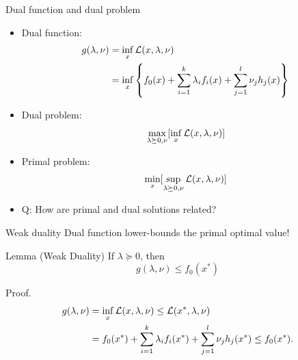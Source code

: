 \documentclass[notes]{beamer}
\begin{document}
\begin{frame}
	{Dual function and dual problem}
	\begin{itemize}
		\item Dual function:
		      \begin{equation*}
			      \begin{aligned}
				      g(\lambda , \nu) & = \inf_x \mathcal{L} (x,\lambda,\nu )                                                                  \\
				                       & =\inf_x \left\{ f_0(x)+\sum_{i=1}^{k} \lambda_i f_i(x) + \sum_{j=1}^{l} \nu_j h_j (x) \right\} \\
			      \end{aligned}
		      \end{equation*}

		\item Dual problem: \[\max_{\lambda \succeq 0,\nu} [\inf_{x} \mathcal{L}(x,\lambda, \nu)] \]
		\item Primal problem: \[\min_x [\sup_{\lambda \succeq 0, \nu} \mathcal{L}(x,\lambda, \nu)] \]
		\item Q: How are primal and dual solutions related?
	\end{itemize}
\end{frame}
\begin{frame}
	{Weak duality}
	Dual function lower-bounds the primal optimal value!
	\begin{block}{Lemma (Weak Duality)}
		If $\lambda \succeq 0$, then \[
			g(\lambda, \nu) \le f_0 (x^*)
		\]
	\end{block}
	\begin{block}{Proof.}
		\begin{equation*}
			\begin{aligned}
				g(\lambda, \nu) & = \inf_x \mathcal{L} (x,\lambda,\nu) \le \mathcal{L} (x^*, \lambda, \nu )                                    \\
				                & = f_0(x^*) +\sum_{i=1}^{k} \lambda_i f_i(x^*) + \sum_{j=1}^{l} \nu_j h_j (x^*) \le f_0(x^*). \\
			\end{aligned}
		\end{equation*}
	\end{block}

\end{frame}
\end{document}
